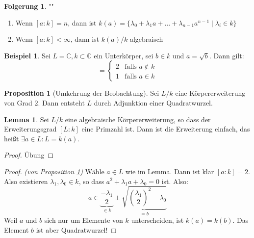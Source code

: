 \documentclass[12pt,parskip=full]{scrartcl}
\newcommand{\setC}{\mathbb{C}}
\theoremstyle{definition}
\newtheorem{corollary}[theorem]{Folgerung}
\newtheorem{proposition}[theorem]{Proposition}
\newtheorem{lemma}[theorem]{Lemma}
\newtheorem{example}[theorem]{Beispiel}
\theoremstyle{remark}
\begin{document}
	\begin{corollary}""
		\begin{enumerate}
			\item Wenn $[a:k] = n$, dann ist $k(a) = \{ \lambda_0 + \lambda_1 a + \dots + \lambda_{n-1} a^{n-1} \mid \lambda_i \in k \}$
			\item Wenn $[a:k] < \infty$, dann ist $k(a)/k$ algebraisch
		\end{enumerate}
	\end{corollary}

	\begin{example}
		Sei $L = \setC, k \subset \setC$ ein Unterkörper, sei $b \in k$ und $a = \sqrt{b}$. Dann gilt:
		\begin{equation*}
			[k(a): k] = \begin{cases}
				2 & \text{falls $a \notin k$} \\
				1 & \text{falls $a \in k$}
			\end{cases}
		\end{equation*}
	\end{example}

	\begin{proposition}[Umkehrung der Beobachtung]
		\label{prop:umkehrungDerBeobachtung}
		Sei $L/k$ eine Körpererweiterung von Grad $2$. Dann entsteht $L$ durch Adjunktion einer Quadratwurzel.
	\end{proposition}

	\begin{lemma}
		Sei $L/k$ eine algebraische Körpererweiterung, so dass der Erweiterungsgrad $[L:k]$ eine Primzahl ist. Dann ist die Erweiterung einfach, das heißt $\exists a \in L: L = k(a)$.
	\end{lemma}

	\begin{proof}
		Übung
	\end{proof}

	\begin{proof}\textit{(von Proposition \ref{prop:umkehrungDerBeobachtung})}
		Wähle $a \in L$ wie im Lemma. Dann ist klar $[a:k] = 2$. Also existieren $\lambda_1, \lambda_0 \in k$, so dass $a^2 + \lambda_1 a + \lambda_0 = 0$ ist. Also:
		\begin{equation*}
			a \in \underbrace{\frac{- \lambda_1}{2}}_{\in k} \pm \underbrace{\sqrt{\left( \frac{\lambda_1}{2} \right)^2 - \lambda_0}}_{=b}
		\end{equation*}
		Weil $a$ und $b$ sich nur um Elemente von $k$ unterscheiden, ist $k(a) = k(b)$. Das Element $b$ ist aber Quadratwurzel!
	\end{proof}
\end{document}
